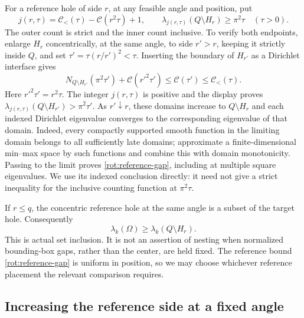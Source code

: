 \documentclass[11pt,reqno]{amsart}
\numberwithin{equation}{section}
\begin{document}
For a reference hole of side $r$, at any feasible angle and position,
put
\begin{equation}\label{rot:reference-gap}
 j(r,\tau)=\mathcal C_{<}(\tau)-\mathcal C(r^2\tau)+1,
 \qquad
 \lambda_{j(r,\tau)}(Q\setminus H_r)\geq\pi^2\tau
 \quad(\tau>0).
\end{equation}
The outer count is strict and the inner count inclusive. To verify both
endpoints, enlarge $H_r$ concentrically, at the same angle, to side
$r'>r$, keeping it strictly inside $Q$, and set
$\tau'=\tau(r/r')^2<\tau$. Inserting the boundary of $H_{r'}$ as a
Dirichlet interface gives
\[
 N_{Q\setminus H_{r'}}(\pi^2\tau')
       +\mathcal C(r'^2\tau')\leq\mathcal C(\tau')
       \leq\mathcal C_{<}(\tau).
\]
Here $r'^2\tau'=r^2\tau$. The integer $j(r,\tau)$ is positive and the
display proves $\lambda_{j(r,\tau)}(Q\setminus H_{r'})>\pi^2\tau'$.
As $r'\downarrow r$, these domains increase to $Q\setminus H_r$ and
each indexed Dirichlet eigenvalue converges to the corresponding
eigenvalue of that domain. Indeed, every compactly supported smooth
function in the limiting domain belongs to all sufficiently late
domains; approximate a finite-dimensional min--max space by such
functions and combine this with domain monotonicity. Passing to the
limit proves \eqref{rot:reference-gap}, including at multiple square
eigenvalues. We use its indexed conclusion directly: it need not give a
strict inequality for the inclusive counting function at $\pi^2\tau$.

If $r\leq q$, the concentric reference hole at the same angle is a
subset of the target hole. Consequently
\begin{equation}\label{rot:nesting}
 \lambda_k(\Omega)\geq\lambda_k(Q\setminus H_r).
\end{equation}
This is actual set inclusion. It is not an assertion of nesting when
normalized bounding-box gaps, rather than the center, are held fixed.
The reference bound \eqref{rot:reference-gap} is uniform in position, so
we may choose whichever reference placement the relevant comparison
requires.

\subsection{Increasing the reference side at a fixed angle}
\label{rot:size-transport}
\end{document}
